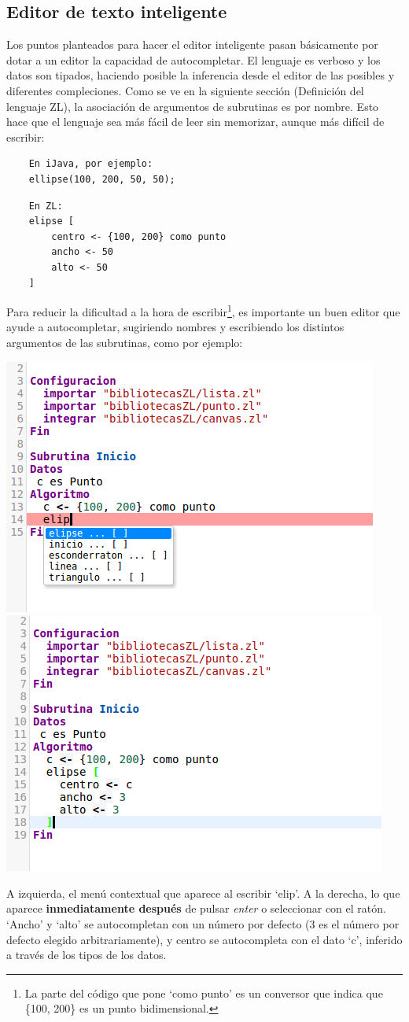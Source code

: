 \documentclass{report}
\begin{document}
	\subsection{Editor de texto inteligente}
	
	Los puntos planteados para hacer el editor inteligente pasan básicamente por dotar a un editor la capacidad de autocompletar. El lenguaje es verboso y los datos son tipados, haciendo posible la inferencia desde el editor de las posibles y diferentes compleciones. Como se ve en la siguiente sección (Definición del lenguaje ZL), la asociación de argumentos de subrutinas es por nombre. Esto hace que el lenguaje sea más fácil de leer sin memorizar, aunque más difícil de escribir:
	
	\vspace{10px}
	
	\begin{BVerbatim}
	En iJava, por ejemplo:
	ellipse(100, 200, 50, 50);
	\end{BVerbatim}
	
	\vspace{10px}
	
	\begin{BVerbatim}
	En ZL:
	elipse [
		centro <- {100, 200} como punto
		ancho <- 50
		alto <- 50
	]
	\end{BVerbatim}
	
	Para reducir la dificultad a la hora de escribir\footnote{La parte del código que pone `como punto' es un conversor que indica que \{100, 200\} es un punto bidimensional.}, es importante un buen editor que ayude a autocompletar, sugiriendo nombres y escribiendo los distintos argumentos de las subrutinas, como por ejemplo:
	
	
	\begin{center}
	\includegraphics[width=0.4\linewidth]{beforecompletion}
	\includegraphics[width=0.4\linewidth]{aftercompletion}
	
	A izquierda, el menú contextual que aparece al escribir `elip'. A la derecha, lo que aparece \textbf{inmediatamente después} de pulsar \textit{enter} o seleccionar con el ratón. `Ancho'  y `alto' se autocompletan con un número por defecto (3 es el número por defecto elegido arbitrariamente), y centro se autocompleta con el dato `c', inferido a través de los tipos de los datos.   
	\end{center}
	
\end{document}
